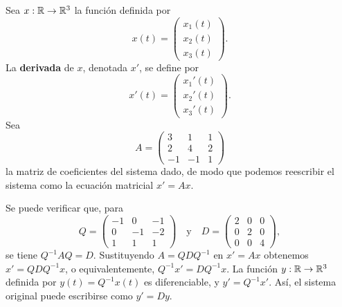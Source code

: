 \documentclass[12pt,a4paper]{book}
\begin{document}
    Sea $x:\mathbb{R}\to\mathbb{R}^3$ la función definida por
    \begin{equation*}
        x(t)=\begin{pmatrix}x_1(t)\\x_2(t)\\x_3(t)\end{pmatrix}.
    \end{equation*}
    La \textbf{derivada} de $x$, denotada $x'$, se define por
    \begin{equation*}
        x'(t)=\begin{pmatrix}x_1'(t)\\x_2'(t)\\x_3'(t)\end{pmatrix}.
    \end{equation*}
    Sea
    \begin{equation*}
        A=\begin{pmatrix}3&1&1\\2&4&2\\-1&-1&1\end{pmatrix}
    \end{equation*}
    la matriz de coeficientes del sistema dado, de modo que podemos reescribir el sistema como la ecuación matricial $x'=Ax$.

    Se puede verificar que, para
    \begin{equation*}
        Q=\begin{pmatrix}-1&0&-1\\0&-1&-2\\1&1&1\end{pmatrix}
        \quad\text{y}\quad
        D=\begin{pmatrix}2&0&0\\0&2&0\\0&0&4\end{pmatrix},
    \end{equation*}
    se tiene $Q^{-1}AQ=D$. Sustituyendo $A=QDQ^{-1}$ en $x'=Ax$ obtenemos $x'=QDQ^{-1}x$, o equivalentemente, $Q^{-1}x'=DQ^{-1}x$. La función $y:\mathbb{R}\to\mathbb{R}^3$ definida por $y(t)=Q^{-1}x(t)$ es diferenciable, y $y'=Q^{-1}x'$. Así, el sistema original puede escribirse como $y'=Dy$.
\end{document}
